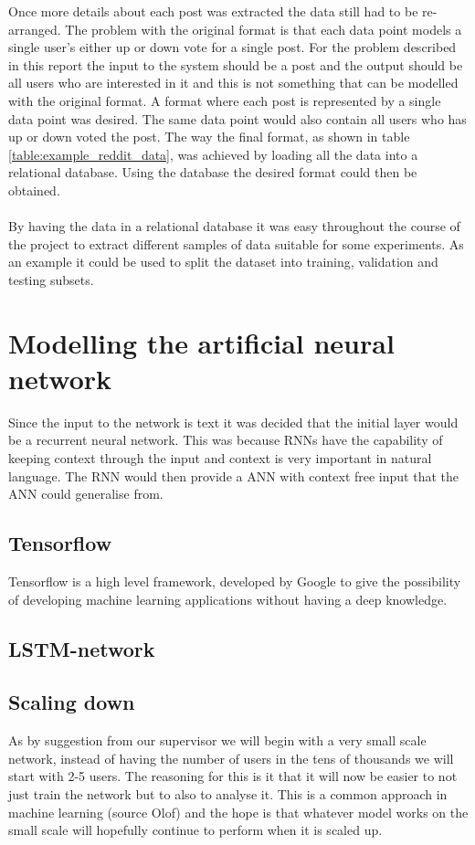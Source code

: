 Once more details about each post was extracted the data still had to be re-arranged. The problem with the original format is that each data point models a single user's either up or down vote for a single post. For the problem described in this report the input to the system should be a post and the output should be all users who are interested in it and this is not something that can be modelled with the original format. A format where each post is represented by a single data point was desired. The same data point would also contain all users who has up or down voted the post. The way the final format, as shown in table \ref{table:example_reddit_data}, was achieved by loading all the data into a relational database. Using the database the desired format could then be obtained.
\\\\
By having the data in a relational database it was easy throughout the course of the project to extract different samples of data suitable for some experiments. As an example it could be used to split the dataset into training, validation and testing subsets.

\section{Modelling the artificial neural network}
Since the input to the network is text it was decided that the initial layer would be a recurrent neural network. This was because RNNs have the capability of keeping context through the input and context is very important in natural language. The RNN would then provide a ANN with context free input that the ANN could generalise from.
\subsection{Tensorflow}%
Tensorflow is a high level framework, developed by Google to give the possibility of developing machine learning applications without having a deep knowledge. %
\subsection{LSTM-network}
\subsection{Scaling down}
As by suggestion from our supervisor we will begin with a very small scale network, instead of having the number of users in the tens of thousands we will start with 2-5 users. The reasoning for this is it that it will now be easier to not just train the network but to also to analyse it. This is a common approach in machine learning (source Olof) and the hope is that whatever model works on the small scale will hopefully continue to perform when it is scaled up.    
